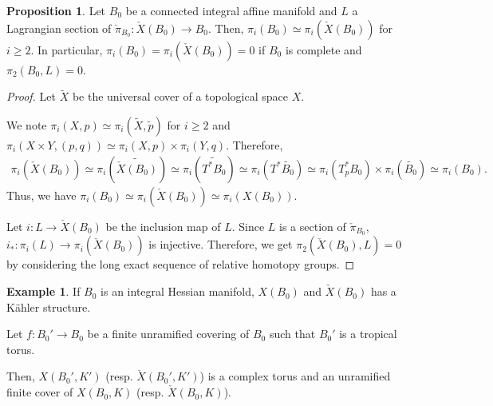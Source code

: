\documentclass[a4paper,dvipdfmx,reqno,12pt]{amsart}
\theoremstyle{definition}
\newtheorem{example}[theorem]{Example}
\newtheorem{proposition}[theorem]{Proposition}
\numberwithin{equation}{section}
\begin{document}
\begin{proposition}

\label{proposition-unobstructed-lagrangian}
Let $B_0$ be a connected integral affine manifold 
and $L$ a Lagrangian section of 
$\check{\pi}_{B_0}\colon \check{X}(B_0)\to B_0$. 
Then, $\pi_i(B_0)\simeq \pi_i(\check{X}(B_0))$ 
for $i\geq 2$.
In particular, 
$\pi_i(B_0)=\pi_i(\check{X}(B_0))=0$ if 
$B_0$ is complete and $\pi_2(B_0,L)=0$.
\end{proposition}
\begin{proof}
Let $\widetilde{X}$ be the universal cover of 
a topological space $X$.


We note $\pi_{i}(X,p)\simeq 
\pi_{i}(\widetilde{X},\tilde{p})$ for $i\geq 2$ and 
$\pi_{i}(X\times Y,(p,q))\simeq \pi_i(X,p)
\times \pi_i(Y,q)$. Therefore,
\begin{align}
\pi_{i}(\check{X}(B_0))\simeq 
\pi_{i}(\widetilde{\check{X}(B_0)})\simeq 
\pi_{i}(\widetilde{T^{*}B_0})\simeq 
\pi_{i}(T^{*}\widetilde{B_0})\simeq 
\pi_{i}(T_p^* B_0)\times \pi_{i}(\widetilde{B_0})\simeq 
\pi_{i}(B_0).
\end{align}
Thus, we have 
$\pi_{i}(B_0)\simeq \pi_{i}(\check{X}(B_0))\simeq 
\pi_{i}(X(B_0))$. 

Let $i\colon L\to \check{X}(B_0)$ be the inclusion map of 
$L$.
Since $L$ is a section of 
$\check{\pi}_{B_0}$, 
$i_*\colon \pi_i(L)\to \pi_i(\check{X}(B_0))$ is 
injective. Therefore, we get 
$\pi_2(\check{X}(B_0),L)=0$ by considering the long exact
sequence of relative homotopy groups.
\end{proof}


\begin{example}
If $B_0$ is an integral Hessian manifold, 
$X(B_0)$ and $\check{X}(B_0)$ has a K\"ahler structure.

Let $f:B_0' \to B_0$ be a finite unramified covering of $B_0$ such that $B_0'$ is a tropical torus.

Then, $X(B_0',K')$ (resp. $\check{X}(B_0',K')$) 
is a complex torus and an unramified finite cover 
of $X(B_0,K)$ (resp. $\check{X}(B_0,K)$).
\end{example}






\printindex
\end{document}
